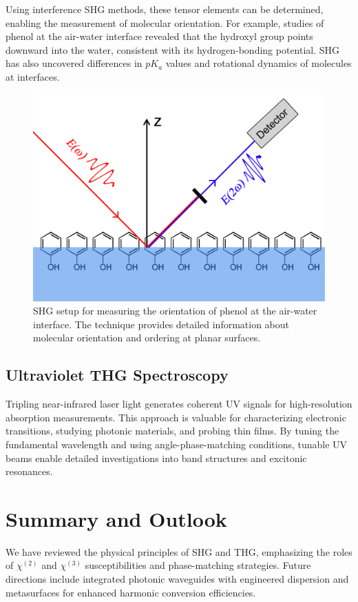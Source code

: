 \documentclass[9pt,a4paper,twocolumn,twoside]{tau-class/tau}
\begin{document}
Using interference SHG methods, these tensor elements can be determined, enabling the measurement of molecular orientation. For example, studies of phenol at the air-water interface revealed that the hydroxyl group points downward into the water, consistent with its hydrogen-bonding potential. SHG has also uncovered differences in $pK_a$ values and rotational dynamics of molecules at interfaces.

\begin{figure}[h!]
\centering
\includegraphics[width=0.7\columnwidth]{figures/SHG_phenol_air-water.png}
\caption{SHG setup for measuring the orientation of phenol at the air-water interface. The technique provides detailed information about molecular orientation and ordering at planar surfaces.}
\end{figure}

\subsection{Ultraviolet THG Spectroscopy}
Tripling near-infrared laser light generates coherent UV signals for high-resolution absorption measurements. This approach is valuable for characterizing electronic transitions, studying photonic materials, and probing thin films. By tuning the fundamental wavelength and using angle-phase-matching conditions, tunable UV beams enable detailed investigations into band structures and excitonic resonances.

\section{Summary and Outlook}
We have reviewed the physical principles of SHG and THG, emphasizing the roles of $\chi^{(2)}$ and $\chi^{(3)}$ susceptibilities and phase-matching strategies. Future directions include integrated photonic waveguides with engineered dispersion and metasurfaces for enhanced harmonic conversion efficiencies.
	
\end{document}
